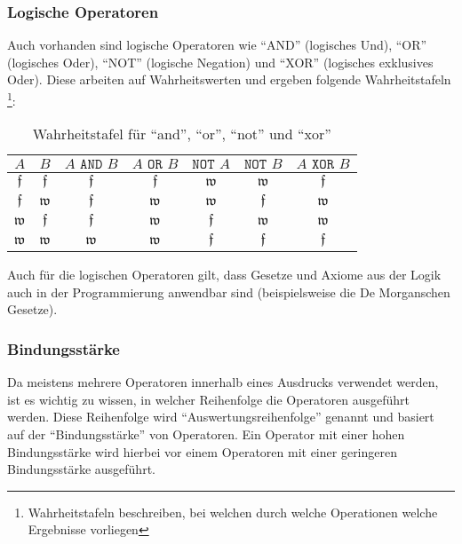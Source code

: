 	\subsubsection{Logische Operatoren}
		Auch vorhanden sind logische Operatoren wie \enquote{AND} (logisches Und), \enquote{OR} (logisches Oder), \enquote{NOT} (logische Negation) und \enquote{XOR} (logisches exklusives Oder). Diese arbeiten auf Wahrheitswerten und ergeben folgende Wahrheitstafeln \footnote{Wahrheitstafeln beschreiben, bei welchen durch welche Operationen welche Ergebnisse vorliegen}:
		\begin{table}[H]
			\centering
			\begin{tabular}{c c | c c c c c}
				$ A $ & $ B $ & $ A \texttt{ AND } B $ & $ A \texttt{ OR } B $ & $ \texttt{NOT } A $ & $ \texttt{NOT } B $ & $ A \texttt{ XOR } B $ \\
				\hline
				$ \mathfrak{f} $ & $ \mathfrak{f} $ & $ \mathfrak{f} $ & $ \mathfrak{f} $ & $ \mathfrak{w} $ & $ \mathfrak{w} $ & $ \mathfrak{f} $ \\
				$ \mathfrak{f} $ & $ \mathfrak{w} $ & $ \mathfrak{f} $ & $ \mathfrak{w} $ & $ \mathfrak{w} $ & $ \mathfrak{f} $ & $ \mathfrak{w} $ \\
				$ \mathfrak{w} $ & $ \mathfrak{f} $ & $ \mathfrak{f} $ & $ \mathfrak{w} $ & $ \mathfrak{f} $ & $ \mathfrak{w} $ & $ \mathfrak{w} $ \\
				$ \mathfrak{w} $ & $ \mathfrak{w} $ & $ \mathfrak{w} $ & $ \mathfrak{w} $ & $ \mathfrak{f} $ & $ \mathfrak{f} $ & $ \mathfrak{f} $ \\
			\end{tabular}
			\caption{Wahrheitstafel für \enquote{and}, \enquote{or}, \enquote{not} und \enquote{xor}}
		\end{table}
		
		
		Auch für die logischen Operatoren gilt, dass Gesetze und Axiome aus der Logik auch in der Programmierung anwendbar sind (beispielsweise die De Morganschen Gesetze).
	
	\subsubsection{Bindungsstärke}
		Da meistens mehrere Operatoren innerhalb eines Ausdrucks verwendet werden, ist es wichtig zu wissen, in welcher Reihenfolge die Operatoren ausgeführt werden. Diese Reihenfolge wird \enquote{Auswertungsreihenfolge} genannt und basiert auf der \enquote{Bindungsstärke} von Operatoren. Ein Operator mit einer hohen Bindungsstärke wird hierbei vor einem Operatoren mit einer geringeren Bindungsstärke ausgeführt.
		
